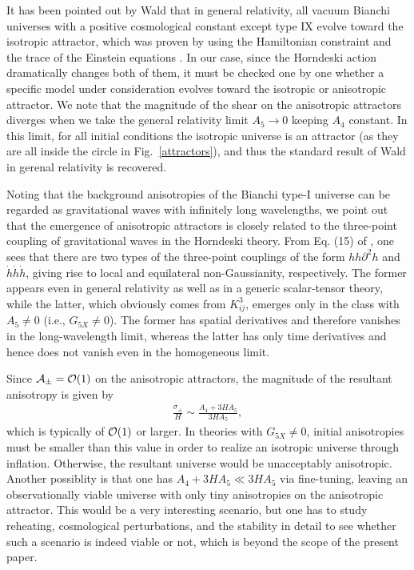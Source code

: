 \documentclass[aps,prd,preprint,superscriptaddress,nofootinbib,tightenlines]{revtex4-1}
\begin{document}
It has been pointed out by Wald that in general relativity, all vacuum Bianchi universes with a positive cosmological constant except type IX evolve toward the isotropic attractor,
which was proven by using the Hamiltonian constraint and the trace of
the Einstein equations \cite{Wald:1983ky}.
In our case, since the Horndeski action dramatically changes both of them,
it must be checked one by one whether a specific model under consideration
evolves toward the isotropic or anisotropic attractor.
We note that the magnitude of
the shear on the anisotropic attractors
diverges when we take the general relativity limit $A_5 \to 0$ keeping $A_4$ constant.
In this limit,
for all initial conditions the isotropic universe is an attractor
(as they are all inside the circle in Fig.~\ref{attractors}),
and thus the standard result of Wald in gerenal relativity is recovered.


Noting that
the background anisotropies of the Bianchi type-I universe can be regarded
as gravitational waves with infinitely long wavelengths,
we point out that
the emergence of anisotropic attractors
is closely related to
the three-point coupling of gravitational waves in the Horndeski theory.
From Eq. (15) of \cite{Gao:2011vs}, one sees that
there are two types of the three-point couplings
of the form $hh\partial^2h$ and $\dot h\dot h\dot h$,
giving rise to local and equilateral non-Gaussianity, respectively.
The former appears even in general relativity as well as in a generic scalar-tensor theory,
while the latter, which obviously comes from $K_{ij}^3$, emerges
only in the class with $A_5\ne 0$ (i.e., $G_{5X}\neq 0$).
The former has spatial derivatives and therefore vanishes in the long-wavelength limit,
whereas the latter has only time derivatives and hence does not vanish
even in the homogeneous limit.


Since ${\cal A_{\pm}}={\cal O}(1)$ on the anisotropic attractors,
the magnitude of the resultant anisotropy is given by
\begin{align}
\frac{\sigma_\pm}{H}\sim \frac{A_4+3HA_5}{3HA_5},
\end{align}
which is typically of ${\cal O}(1)$ or larger.
In theories with $G_{5X}\neq 0$, initial anisotropies must be
smaller than this value in order to realize an isotropic universe
through inflation. Otherwise, the resultant universe would be
unacceptably anisotropic.
Another possiblity is that one has
$A_4+3HA_5\ll 3HA_5$ via fine-tuning,
leaving an observationally viable universe with only tiny anisotropies
on the anisotropic attractor. This would be a very interesting scenario,
but one has to study reheating, cosmological perturbations, and
the stability in detail to see whether such a scenario is indeed viable or not,
which is beyond the scope of the present paper.
\end{document}

